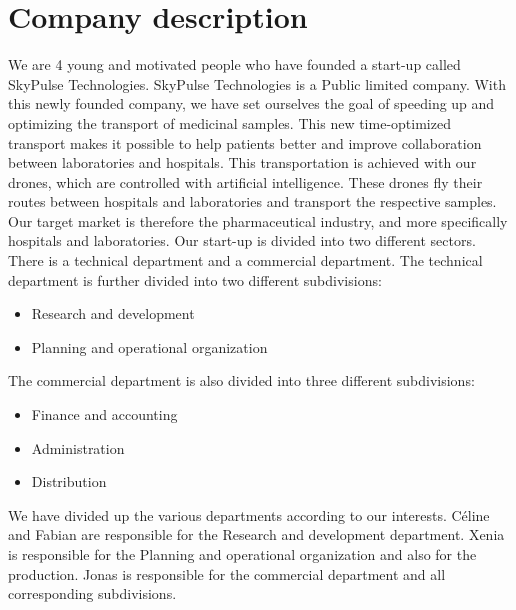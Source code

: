 \chapter{Company description} \label{description}

We are 4 young and motivated people who have founded a start-up called SkyPulse Technologies. SkyPulse Technologies is a Public limited company. With this newly founded company, we have set ourselves the goal of speeding up and optimizing the transport of medicinal samples. This new time-optimized transport makes it possible to help patients better and improve collaboration between laboratories and hospitals. This transportation is achieved with our drones, which are controlled with artificial intelligence. These drones fly their routes between hospitals and laboratories and transport the respective samples.
\newline
Our target market is therefore the pharmaceutical industry, and more specifically hospitals and laboratories.
\newline
Our start-up is divided into two different sectors. There is a technical department and a commercial department. The technical department is further divided into two different subdivisions:
\begin{itemize}
  \item Research and development
  \item Planning and operational organization
\end{itemize}
The commercial department is also divided into three different subdivisions:
\begin{itemize}
  \item Finance and accounting
  \item Administration
  \item Distribution
\end{itemize}
We have divided up the various departments according to our interests. Céline and Fabian are responsible for the Research and development department. Xenia is responsible for the Planning and operational organization and also for the production. Jonas is responsible for the commercial department and all corresponding subdivisions.